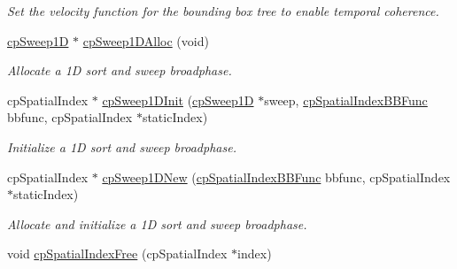 \begin{DoxyCompactItemize}
\begin{DoxyCompactList}\small\item\em Set the velocity function for the bounding box tree to enable temporal coherence. \end{DoxyCompactList}\item 
\hypertarget{group__cp_spatial_index_ga04e4015461583471c66a58e9d6874679}{\hyperlink{structcp_sweep1_d}{cp\-Sweep1\-D} $\ast$ \hyperlink{group__cp_spatial_index_ga04e4015461583471c66a58e9d6874679}{cp\-Sweep1\-D\-Alloc} (void)}\label{group__cp_spatial_index_ga04e4015461583471c66a58e9d6874679}

\begin{DoxyCompactList}\small\item\em Allocate a 1\-D sort and sweep broadphase. \end{DoxyCompactList}\item 
\hypertarget{group__cp_spatial_index_ga69af70bd9dbc39de7c98d677c872ca80}{cp\-Spatial\-Index $\ast$ \hyperlink{group__cp_spatial_index_ga69af70bd9dbc39de7c98d677c872ca80}{cp\-Sweep1\-D\-Init} (\hyperlink{structcp_sweep1_d}{cp\-Sweep1\-D} $\ast$sweep, \hyperlink{group__cp_spatial_index_gafbecd34bd436d4a56200b7a542d94fc1}{cp\-Spatial\-Index\-B\-B\-Func} bbfunc, cp\-Spatial\-Index $\ast$static\-Index)}\label{group__cp_spatial_index_ga69af70bd9dbc39de7c98d677c872ca80}

\begin{DoxyCompactList}\small\item\em Initialize a 1\-D sort and sweep broadphase. \end{DoxyCompactList}\item 
\hypertarget{group__cp_spatial_index_gaaec0552c5ec0a4014d8930c0203261d9}{cp\-Spatial\-Index $\ast$ \hyperlink{group__cp_spatial_index_gaaec0552c5ec0a4014d8930c0203261d9}{cp\-Sweep1\-D\-New} (\hyperlink{group__cp_spatial_index_gafbecd34bd436d4a56200b7a542d94fc1}{cp\-Spatial\-Index\-B\-B\-Func} bbfunc, cp\-Spatial\-Index $\ast$static\-Index)}\label{group__cp_spatial_index_gaaec0552c5ec0a4014d8930c0203261d9}

\begin{DoxyCompactList}\small\item\em Allocate and initialize a 1\-D sort and sweep broadphase. \end{DoxyCompactList}\item 
\hypertarget{group__cp_spatial_index_ga13a62ecd13b6dbee7d4c8ae056e0f86f}{void \hyperlink{group__cp_spatial_index_ga13a62ecd13b6dbee7d4c8ae056e0f86f}{cp\-Spatial\-Index\-Free} (cp\-Spatial\-Index $\ast$index)}\label{group__cp_spatial_index_ga13a62ecd13b6dbee7d4c8ae056e0f86f}


\end{DoxyCompactItemize}
